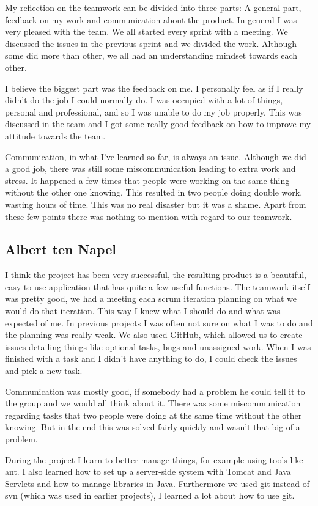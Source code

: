 \documentclass[a4paper]{article}
\begin{document}
My reflection on the teamwork can be divided into three parts: A general part, feedback on my work and communication about the product.
In general I was very pleased with the team. We all started every sprint with a meeting. We discussed the issues in the previous sprint and we divided the work. Although some did more than other, we all had an understanding mindset towards each other.

I believe the biggest part was the feedback on me. I personally feel as if I really didn't do the job I could normally do. I was occupied with a lot of things, personal and professional, and so I was unable to do my job properly. This was discussed in the team and I got some really good feedback on how to improve my attitude towards the team. 

Communication, in what I've learned so far, is always an issue. Although we did a good job, there was still some miscommunication leading to extra work and stress. It happened a few times that people were working on the same thing without the other one knowing. This resulted in two people doing double work, wasting hours of time. This was no real disaster but it was a shame. Apart from these few points there was nothing to mention with regard to our teamwork.

\subsection{Albert ten Napel}
I think the project has been very successful, the resulting product is a beautiful, easy to use application that has quite a few useful functions. The teamwork itself was pretty good, we had a meeting each scrum iteration planning on what we would do that iteration. This way I knew what I should do and what was expected of me. In previous projects I was often not sure on what I was to do and the planning was really weak. We also used GitHub, which allowed us to create issues detailing things like optional tasks, bugs and unassigned work. When I was finished with a task and I didn't have anything to do, I could check the issues and pick a new task.

Communication was mostly good, if somebody had a problem he could tell it to the group and we would all think about it. There was some miscommunication regarding tasks that two people were doing at the same time without the other knowing. But in the end this was solved fairly quickly and wasn't that big of a problem.

During the project I learn to better manage things, for example using tools like ant. I also learned how to set up a server-side system with Tomcat and Java Servlets and how to manage libraries in Java. Furthermore we used git instead of svn (which was used in earlier projects), I learned a lot about how to use git.
\end{document}
